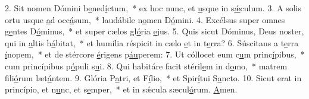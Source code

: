 2. Sit nomen Dómini b\uline{e}ned\uline{í}ctum,~* ex hoc nunc, et \uline{u}sque in s\uline{ǽ}culum.
3. A solis ortu usque \uline{a}d occ\uline{á}sum,~* laudábile n\uline{o}men D\uline{ó}mini.
4. Excélsus super omnes g\uline{e}ntes D\uline{ó}minus,~* et super cælos gl\uline{ó}ria \uline{e}jus.
5. Quis sicut Dóminus, Deus noster, qui in \uline{a}ltis h\uline{á}bitat,~* et humília réspicit in cælo \uline{e}t in t\uline{e}rra?
6. Súscitans a t\uline{e}rra \uline{í}nopem,~* et de stércore \uline{é}rigens p\uline{áu}perem:
7. Ut cóllocet eum c\uline{u}m princ\uline{í}pibus,~* cum princípibus p\uline{ó}puli s\uline{u}i.
8. Qui habitáre facit stéril\uline{e}m in d\uline{o}mo,~* matrem fili\uline{ó}rum læt\uline{á}ntem.
9. Glória P\uline{a}tri, et F\uline{í}lio,~* et Spir\uline{í}tui S\uline{a}ncto.
10. Sicut erat in princípio, et n\uline{u}nc, et s\uline{e}mper,~* et in sǽcula sæcul\uline{ó}rum. \uline{A}men.
